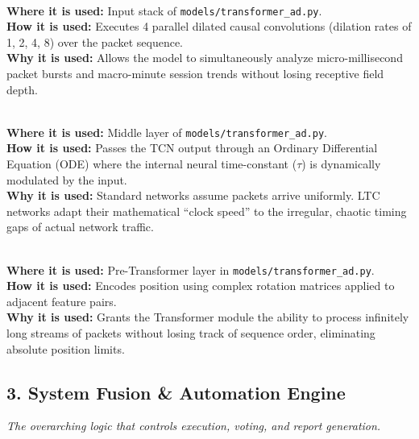 \documentclass[11pt,a4paper]{article}
\begin{document}
\begin{description}[style=unboxed, leftmargin=0cm]
    \item[\textcolor{primary}{7. Multi-Scale Temporal Convolution (TCN) (v3)}] \hfill \\
    \textbf{Where it is used:} Input stack of \texttt{models/transformer\_ad.py}. \\
    \textbf{How it is used:} Executes 4 parallel dilated causal convolutions (dilation rates of 1, 2, 4, 8) over the packet sequence. \\
    \textbf{Why it is used:} Allows the model to simultaneously analyze micro-millisecond packet bursts and macro-minute session trends without losing receptive field depth.

    \item[\textcolor{primary}{8. Liquid Time-Constant (LTC) Networks (v4)}] \hfill \\
    \textbf{Where it is used:} Middle layer of \texttt{models/transformer\_ad.py}. \\
    \textbf{How it is used:} Passes the TCN output through an Ordinary Differential Equation (ODE) where the internal neural time-constant ($\tau$) is dynamically modulated by the input. \\
    \textbf{Why it is used:} Standard networks assume packets arrive uniformly. LTC networks adapt their mathematical ``clock speed'' to the irregular, chaotic timing gaps of actual network traffic.

    \item[\textcolor{primary}{9. Rotary Position Embedding (RoPE) (v3)}] \hfill \\
    \textbf{Where it is used:} Pre-Transformer layer in \texttt{models/transformer\_ad.py}. \\
    \textbf{How it is used:} Encodes position using complex rotation matrices applied to adjacent feature pairs. \\
    \textbf{Why it is used:} Grants the Transformer module the ability to process infinitely long streams of packets without losing track of sequence order, eliminating absolute position limits.
\end{description}

\subsection{3. System Fusion \& Automation Engine}
\textit{The overarching logic that controls execution, voting, and report generation.}
\end{document}
